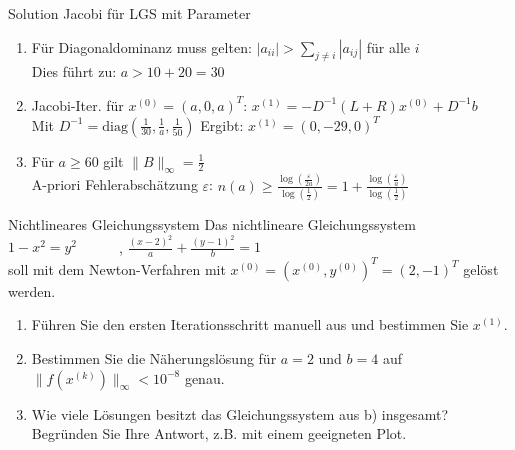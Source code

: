\begin{KR}{Solution Jacobi für LGS mit Parameter}
\begin{enumerate}
    \item Für Diagonaldominanz muss gelten:
    $|a_{ii}| > \sum_{j\neq i} |a_{ij}|$ für alle $i$\\
    Dies führt zu: $a > 10 + 20 = 30$
    
    \item Jacobi-Iter. für $x^{(0)} = (a,0,a)^T$:
    $x^{(1)} = -D^{-1}(L+R)x^{(0)} + D^{-1}b$\\
    Mit $D^{-1} = \text{diag}(\frac{1}{30}, \frac{1}{a}, \frac{1}{50})$
    Ergibt: $x^{(1)} = (0,-29,0)^T$
    
    \item Für $a \geq 60$ gilt $\|B\|_\infty = \frac{1}{2}$\\
    A-priori Fehlerabschätzung $\varepsilon$:
    $n(a) \geq \frac{\log(\frac{\varepsilon}{2a})}{\log(\frac{1}{2})} = 1 + \frac{\log(\frac{\varepsilon}{a})}{\log(\frac{1}{2})}$
\end{enumerate}
\end{KR}


\begin{example2}{Nichtlineares Gleichungssystem}
Das nichtlineare Gleichungssystem\\
$1 - x^2 = y^2 \quad \quad \quad$,
$\frac{(x-2)^2}{a} + \frac{(y-1)^2}{b} = 1$\\
soll mit dem Newton-Verfahren mit $x^{(0)} = (x^{(0)}, y^{(0)})^T = (2,-1)^T$ gelöst werden.
\begin{enumerate}
    \item Führen Sie den ersten Iterationsschritt manuell aus und bestimmen Sie $x^{(1)}$.
    
    \item Bestimmen Sie die Näherungslösung für $a = 2$ und $b = 4$ auf $\|f(x^{(k)})\|_\infty < 10^{-8}$ genau.
    
    \item Wie viele Lösungen besitzt das Gleichungssystem aus b) insgesamt? Begründen Sie Ihre Antwort, z.B. mit einem geeigneten Plot.
\end{enumerate}
\end{example2}

